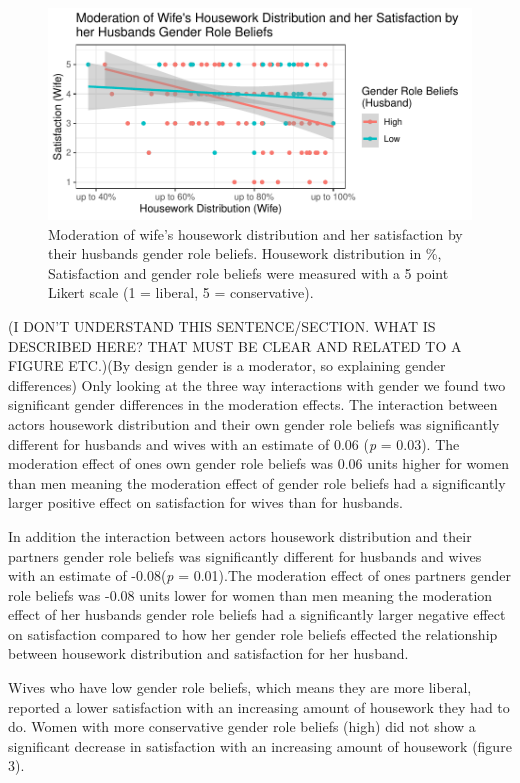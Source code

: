 \documentclass[
  man,floatsintext]{apa6}
\begin{document}
\begin{figure}
\centering
\includegraphics{results_files/figure-latex/unnamed-chunk-13-1.pdf}
\caption{\label{fig:unnamed-chunk-13}Moderation of wife's housework distribution and her satisfaction by their husbands gender role beliefs. Housework distribution in \%, Satisfaction and gender role beliefs were measured with a 5 point Likert scale (1 = liberal, 5 = conservative).}
\end{figure}

(I DON'T UNDERSTAND THIS SENTENCE/SECTION. WHAT IS DESCRIBED HERE? THAT MUST BE CLEAR AND RELATED TO A FIGURE ETC.)(By design gender is a moderator, so explaining gender differences) Only looking at the three way interactions with gender we found two significant gender differences in the moderation effects. The interaction between actors housework distribution and their own gender role beliefs was significantly different for husbands and wives with an estimate of 0.06 (\emph{p} = 0.03). The moderation effect of ones own gender role beliefs was 0.06 units higher for women than men meaning the moderation effect of gender role beliefs had a significantly larger positive effect on satisfaction for wives than for husbands.

In addition the interaction between actors housework distribution and their partners gender role beliefs was significantly different for husbands and wives with an estimate of -0.08(\emph{p} = 0.01).The moderation effect of ones partners gender role beliefs was -0.08 units lower for women than men meaning the moderation effect of her husbands gender role beliefs had a significantly larger negative effect on satisfaction compared to how her gender role beliefs effected the relationship between housework distribution and satisfaction for her husband.

Wives who have low gender role beliefs, which means they are more liberal, reported a lower satisfaction with an increasing amount of housework they had to do. Women with more conservative gender role beliefs (high) did not show a significant decrease in satisfaction with an increasing amount of housework (figure 3).
\end{document}
